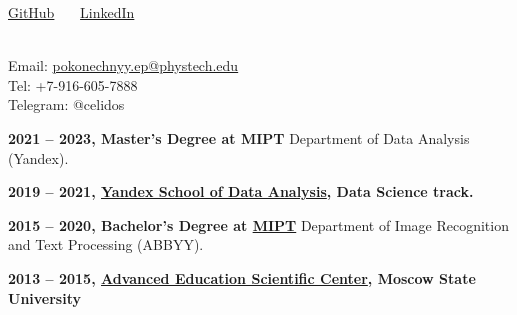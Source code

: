 \documentclass[a4paper,12pt]{memoir} %
\begin{document}
	\begin{minipage}[t]{0.5\textwidth}
		\href{https://github.com/celidos}{GitHub} ~~~\href{https://www.linkedin.com/in/eduard-pokonechnyy-855415196/}{LinkedIn} ~~~ \\
	\end{minipage}
	\begin{minipage}[t]{0.5\textwidth}
		\begin{flushright}
			~\\
			Email: \href{mailto:pokonechnyy.ep@phystech.edu}{pokonechnyy.ep@phystech.edu}\\
			Tel: +7-916-605-7888\\
			Telegram: @celidos
		\end{flushright}
	\end{minipage}
	
	
	\Sep
	
	
	\textbf{2021 -- 2023, Master's Degree at MIPT}
	{
		\newline
		 Department of Data Analysis (Yandex).
	}
	
	\SepSep
	\textbf{2019 -- 2021, \href{https://yandexdataschool.com/edu-process/program/data-science}{Yandex School of Data Analysis}, Data Science track.}
	
	\SepSep
	\textbf{2015 -- 2020, Bachelor's Degree at \href{https://mipt.ru/english/}{MIPT}}{
		\newline
		 Department of Image Recognition and Text Processing (ABBYY).
	}
	
	\SepSep
	\textbf{2013 -- 2015, \href{https://internat.msu.ru/en/}{Advanced Education Scientific Center}, Moscow State University}
	
	~
	
	\Sep
	
	
\end{document}

